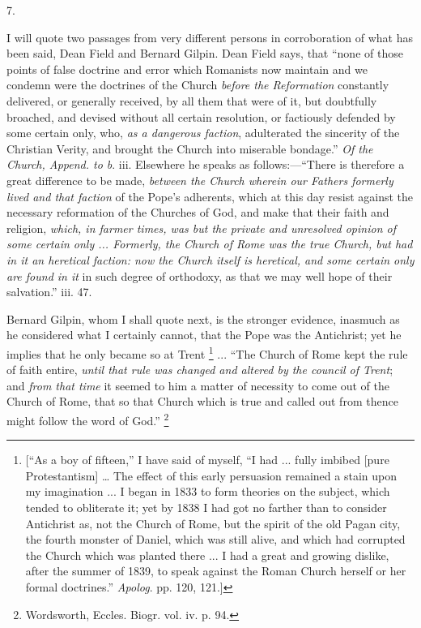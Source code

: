 7.

I will quote two passages from very different
persons in corroboration of what has been said, Dean Field and Bernard
Gilpin. Dean Field says, that ``none of those points of false
doctrine and error which Romanists now maintain and we condemn were
the doctrines of the Church \emph{before the Reformation} constantly
delivered, or generally received, by all them that were of it,
but doubtfully broached, and devised without all certain resolution,
or factiously defended by some certain only, who, \emph{as a dangerous
faction}, adulterated the sincerity of the Christian Verity, and
brought the Church into miserable bondage.'' \emph{Of the Church,
Append. to b}. iii. Elsewhere he speaks as follows:—``There is
therefore a great difference to be made, \emph{between the Church wherein
our Fathers formerly lived and that faction} of the Pope's
adherents, which at this day resist against the necessary reformation
of the Churches of God, and make that their faith and religion, \emph{which,
in farmer times, was but the private and unresolved opinion of some
certain only ... Formerly, the Church of Rome was the true Church, but
had in it an heretical faction: now the Church itself is heretical,
and some certain only are found in it} in such degree of orthodoxy,
as that we may well hope of their salvation.'' iii. 47.

Bernard Gilpin, whom I shall quote next, is the
stronger evidence, inasmuch as he considered what I certainly cannot,
that the Pope was the Antichrist; yet he implies that he only became
so at Trent \footnote{[``As a boy of fifteen,'' I have said of myself, ``I had ... fully
imbibed [pure Protestantism] … The effect of this early persuasion
remained a stain upon my imagination ... I began in 1833 to form
theories on the subject, which tended to obliterate it; yet by 1838 I
had got no farther than to consider Antichrist as, not the Church of
Rome, but the spirit of the old Pagan city, the fourth monster of
Daniel, which was still alive, and which had corrupted the Church
which was planted there ... I had a great and growing dislike, after
the summer of 1839, to speak against the Roman Church herself or her
formal doctrines.'' \emph{Apolog}. pp. 120, 121.]} ... ``The Church of Rome kept the rule of faith
entire, \emph{until that rule was changed and altered by the council of
Trent}; and \emph{from that time} it seemed to him a matter of necessity
to come out of the Church of Rome, that so that Church which is true
and called out from thence might follow the word of God.'' \footnote{Wordsworth, Eccles. Biogr. vol. iv. p. 94.}

